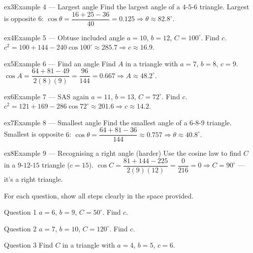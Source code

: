 \documentclass[11pt]{article}
\begin{document}
\begin{example}{ex3}{Example 4 --- Largest angle}
Find the largest angle of a $4$-$5$-$6$ triangle.
\soln Largest is opposite $6$: $\cos\theta=\dfrac{16+25-36}{40}=0.125\Rightarrow\theta\approx82.8^\circ.$
\end{example}

\begin{example}{ex4}{Example 5 --- Obtuse included angle}
$a=10$, $b=12$, $C=100^\circ$. Find $c$.
\soln $c^2=100+144-240\cos100^\circ\approx285.7\Rightarrow c\approx16.9.$
\end{example}

\begin{example}{ex5}{Example 6 --- Find an angle}
Find $A$ in a triangle with $a=7$, $b=8$, $c=9$.
\soln $\cos A=\dfrac{64+81-49}{2(8)(9)}=\dfrac{96}{144}=0.667\Rightarrow A\approx48.2^\circ.$
\end{example}

\begin{example}{ex6}{Example 7 --- SAS again}
$a=11$, $b=13$, $C=72^\circ$. Find $c$.
\soln $c^2=121+169-286\cos72^\circ\approx201.6\Rightarrow c\approx14.2.$
\end{example}

\begin{example}{ex7}{Example 8 --- Smallest angle}
Find the smallest angle of a $6$-$8$-$9$ triangle.
\soln Smallest is opposite $6$: $\cos\theta=\dfrac{64+81-36}{144}\approx0.757\Rightarrow\theta\approx40.8^\circ.$
\end{example}

\begin{example}{ex8}{Example 9 --- Recognising a right angle (harder)}
Use the cosine law to find $C$ in a $9$-$12$-$15$ triangle ($c=15$).
\soln $\cos C=\dfrac{81+144-225}{2(9)(12)}=\dfrac{0}{216}=0\Rightarrow C=90^\circ$ --- it's a right triangle.
\end{example}

\clearpage
{}
For each question, show all steps clearly in the space provided.

\begin{qbox}{Question 1}
$a=6$, $b=9$, $C=50^\circ$. Find $c$.\workspace{2.4cm}
\end{qbox}

\begin{qbox}{Question 2}
$a=7$, $b=10$, $C=120^\circ$. Find $c$.\workspace{2.4cm}
\end{qbox}

\begin{qbox}{Question 3}
Find $C$ in a triangle with $a=4$, $b=5$, $c=6$.\workspace{2.4cm}
\end{qbox}
\end{document}
